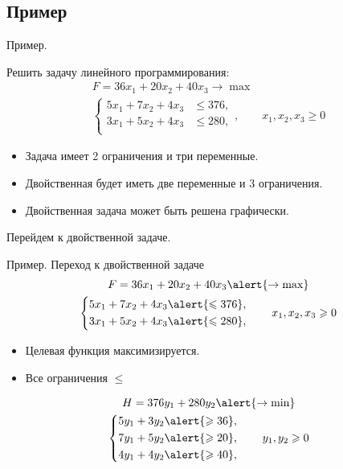 \documentclass[unicode,11pt,notheorems,xcolor=table]{beamer}
\begin{document}
\subsection{Пример}


\begin{frame}{Пример.}
\begin{exampleblock}{}
Решить задачу линейного программирования:
$$
\begin{gathered}
	F = 36x_1+20x_2+40x_3 \to \max\\
	\left\lbrace \begin{aligned}
		5x_1+7x_2+4x_3 &\leqslant 376,\\
		3x_1+5x_2+4x_3 &\leqslant 280,\\
	\end{aligned}
	\right.,\qquad x_1,x_2,x_3 \geqslant 0 
\end{gathered}
$$
\end{exampleblock}
\begin{itemize}
\item 
	Задача имеет 2 ограничения и три переменные. 
\item 
	Двойственная будет иметь две переменные и 3 ограничения.  
\item 
	Двойственная задача может быть решена графически.  
\end{itemize}
\alert{Перейдем к двойственной задаче}.
\end{frame}

\begin{frame}{Пример. Переход к двойственной задаче}
$$
\begin{gathered}
	F = 36x_1+20x_2+40x_3 \alert{\to \max}\\
	\left\lbrace \begin{aligned}
		5x_1+7x_2+4x_3 &\alert{\leqslant 376},\\
		3x_1+5x_2+4x_3 &\alert{\leqslant 280},\\
	\end{aligned}
	\right.\qquad x_1,x_2,x_3 \geqslant 0 
\end{gathered}
$$

\begin{itemize}
\item 
	Целевая функция максимизируется.
\item 
	Все ограничения  $\leqslant$
\end{itemize}

$$
\begin{gathered}
	H = 376y_1+280y_2 \alert{\to \min}\\
	\left\lbrace \begin{aligned}
		5y_1+3y_2 &\alert{\geqslant 36},\\
		7y_1+5y_2 &\alert{\geqslant 20},\\
		4y_1+4y_2 &\alert{\geqslant 40},\\
	\end{aligned}
	\right.\qquad y_1,y_2 \geqslant 0 
\end{gathered}
$$

\end{frame}
\end{document}
